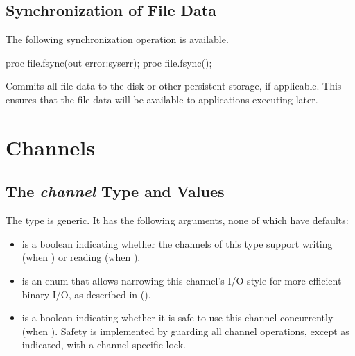 \subsection{Synchronization of File Data}
\label{IO_file_synchronization}

The following synchronization operation is available.

\begin{protohead}
proc file.fsync(out error:syserr);
proc file.fsync();
\end{protohead}
\begin{protobody}
Commits all file data to the disk or other persistent storage, if
applicable. This ensures that the file data will be available to
applications executing later.
\end{protobody}


\section{Channels}
\label{IO_channels}


\subsection{The {\em channel} Type and Values}
\label{IO_channel_type}

The  type is generic. It has the following arguments,
none of which have defaults:

\begin{itemize}

\item {} is a boolean indicating whether the channels of this type
      support writing (when ) or reading (when ).

\item {} is an enum  that allows narrowing
      this channel's I/O style for more efficient binary I/O,
      as described in ().

\item {} is a boolean indicating whether it is
      safe to use this channel concurrently (when ).
      Safety is implemented by guarding all channel operations, except
      as indicated, with a channel-specific lock.

\end{itemize}

